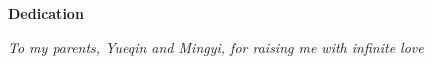 

\begin{center}

\vspace*{5\baselineskip}
\textbf{\large Dedication}
\end{center}




\begin{flushleft}
\hspace{10mm}\textit{\large To my parents, Yueqin and Mingyi, for raising me with infinite love }
\end{flushleft}




